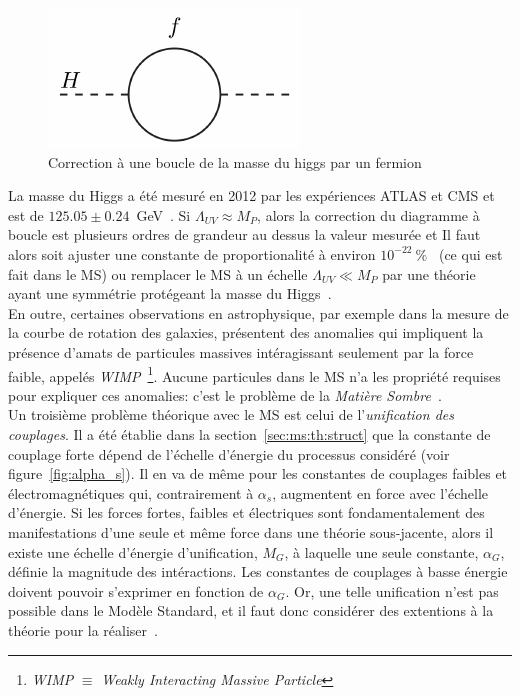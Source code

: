 \begin{figure}
  \centering
  \includegraphics{higgs-loop.pdf}
  \caption{Correction à une boucle de la masse du higgs par un fermion}
  \label{fig:hloop}
\end{figure}

La masse du Higgs a été mesuré en 2012 par les expériences ATLAS et
CMS et est de
$125.05 \pm 0.24$~GeV~\cite{atlas_collaboration_combined_2015}. Si
$\Lambda_{UV} \approx M_P$, alors la correction du diagramme à boucle
est plusieurs ordres de grandeur au dessus la valeur mesurée et Il
faut alors soit ajuster une constante de proportionalité à environ
$10^{-22}~\%$~\cite{giudice_naturally_20087} (ce qui est fait dans le
MS) ou remplacer le MS à un échelle $\Lambda_{UV} \ll M_P$ par une
théorie ayant une symmétrie protégeant la masse du
Higgs~\cite{martin_supersymmetry_1997}. \\

En outre, certaines observations en astrophysique, par exemple dans la
mesure de la courbe de rotation des galaxies, présentent des anomalies
qui impliquent la présence d'amats de particules massives
intéragissant seulement par la force faible, appelés
\emph{WIMP}~\footnote{\emph{WIMP} $\equiv$ \emph{Weakly Interacting
    Massive Particle}}. Aucune particules dans le MS n'a les propriété
requises pour expliquer ces anomalies: c'est le problème de la
\emph{Matière Sombre}~\cite{bertone_particle_2005}. \\

Un troisième problème théorique avec le MS est celui de
l'\emph{unification des couplages}. Il a été établie dans la
section~\ref{sec:ms:th:struct} que la constante de couplage forte
dépend de l'échelle d'énergie du processus considéré (voir
figure~\ref{fig:alpha_s}). Il en va de même pour les constantes de
couplages faibles et électromagnétiques qui, contrairement à
$\alpha_s$, augmentent en force avec l'échelle d'énergie. Si les
forces fortes, faibles et électriques sont fondamentalement des
manifestations d'une seule et même force dans une théorie
sous-jacente, alors il existe une échelle d'énergie d'unification,
$M_G$, à laquelle une seule constante, $\alpha_G$, définie la magnitude
des intéractions. Les constantes de couplages à basse énergie doivent pouvoir
s'exprimer en fonction de $\alpha_G$. Or, une telle unification n'est
pas possible dans le Modèle Standard, et il faut donc considérer des
extentions à la théorie pour la réaliser~\cite{olive_review_2014,thomson_modern_2013}.


